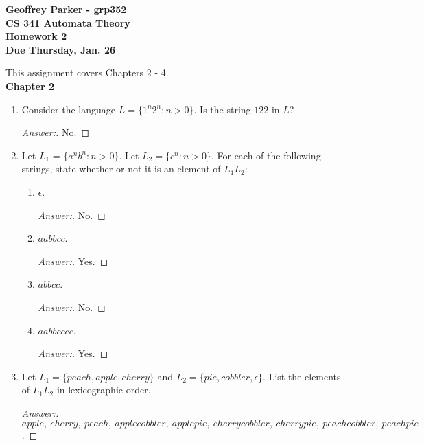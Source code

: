 \documentclass[10pt]{article}
\newcommand{\chtitle}[1]{\noindent \vspace{5mm}\textbf{Chapter #1}\vspace{3mm}}
\begin{document}
\begin{flushleft}
\textbf{Geoffrey Parker - grp352 \\
CS 341 Automata Theory \\
Homework 2 \\
Due Thursday, Jan. 26}
\end{flushleft}
This assignment covers Chapters 2 - 4. \\

\chtitle{2}

\begin{enumerate}


\item
Consider the language $L = \{1^n2^n: n > 0\}$.  Is the string $122$ in $L$?
\begin{proof}[Answer:]
No.
\end{proof}


\item
Let $L_1$ = $\{a^nb^n: n > 0\}$.  Let $L_2 = \{c^n: n > 0\}$.  For each of the following strings, state whether or not it is an element of $L_1L_2$:
\begin{enumerate}

\item
$\epsilon$.
\begin{proof}[Answer:]
No.
\end{proof}

\item
$aabbcc$.
\begin{proof}[Answer:]
Yes.
\end{proof}

\item
$abbcc$.
\begin{proof}[Answer:]
No.
\end{proof}

\item
$aabbcccc$.
\begin{proof}[Answer:]
Yes.
\end{proof}
\end{enumerate}


\item
Let $L_1 = \{peach, apple, cherry\}$ and $L_2 = \{pie, cobbler, \epsilon\}$.  List the elements of $L_1L_2$ in lexicographic order.
\begin{proof}[Answer:]
$apple,\ cherry,\ peach,\ applecobbler,\ applepie,\ cherrycobbler,\ cherrypie,\ peachcobbler,\ peachpie$.
\end{proof}


\end{enumerate}
\end{document}
